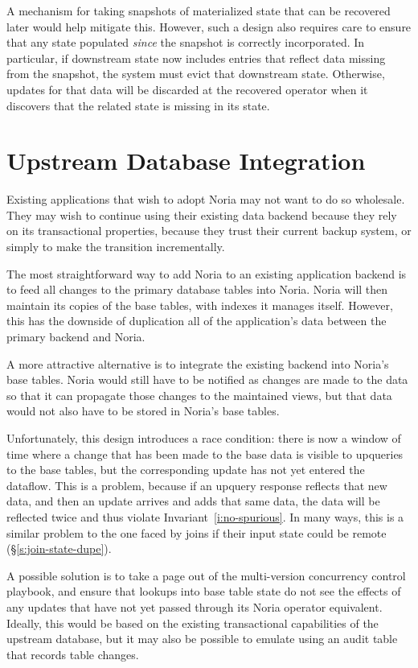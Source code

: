 A mechanism for taking snapshots of materialized state that can be recovered
later would help mitigate this. However, such a design also requires care to
ensure that any state populated \emph{since} the snapshot is correctly
incorporated. In particular, if downstream state now includes entries that
reflect data missing from the snapshot, the system must evict that downstream
state. Otherwise, updates for that data will be discarded at the recovered
operator when it discovers that the related state is missing in its state.

\section{Upstream Database Integration}

Existing applications that wish to adopt Noria may not want to do so wholesale.
They may wish to continue using their existing data backend because they rely on
its transactional properties, because they trust their current backup system, or
simply to make the transition incrementally.

The most straightforward way to add Noria to an existing application backend is
to feed all changes to the primary database tables into Noria. Noria will then
maintain its copies of the base tables, with indexes it manages itself. However,
this has the downside of duplication all of the application's data between the
primary backend and Noria.

A more attractive alternative is to integrate the existing backend into Noria's
base tables. Noria would still have to be notified as changes are made to the
data so that it can propagate those changes to the maintained views, but that
data would not also have to be stored in Noria's base tables.

Unfortunately, this design introduces a race condition: there is now a window of
time where a change that has been made to the base data is visible to upqueries
to the base tables, but the corresponding update has not yet entered the
dataflow. This is a problem, because if an upquery response reflects that new
data, and then an update arrives and adds that same data, the data will be
reflected twice and thus violate Invariant~\ref{i:no-spurious}. In many ways,
this is a similar problem to the one faced by joins if their input state could
be remote (\S\ref{s:join-state-dupe}).

A possible solution is to take a page out of the multi-version concurrency
control playbook, and ensure that lookups into base table state do not see the
effects of any updates that have not yet passed through its Noria operator
equivalent. Ideally, this would be based on the existing transactional
capabilities of the upstream database, but it may also be possible to emulate
using an audit table that records table changes.

